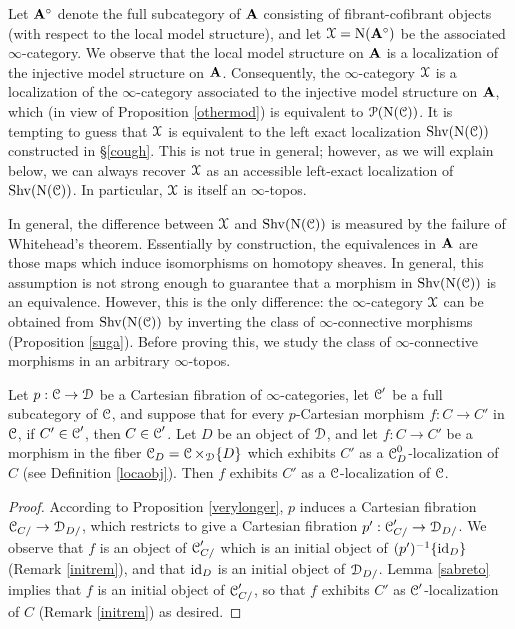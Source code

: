 Let ${\mathbf A}^{\circ}$ denote the full subcategory of ${\mathbf A}$ consisting of fibrant-cofibrant objects (with respect to the local model structure), and let $\operatorname{\mathcal{X}} = \operatorname{N}({\mathbf A}^{\circ})$ be the associated $\infty$-category. We observe that the local model structure on ${\mathbf A}$ is a localization of the injective model structure on ${\mathbf A}$. Consequently, the $\infty$-category $\operatorname{\mathcal{X}}$ is a localization of the $\infty$-category associated to the injective model structure on ${\mathbf A}$, which (in view of 
Proposition \ref{othermod}) is equivalent to $\operatorname{\mathcal{P}}( \operatorname{N}(\operatorname{\mathcal{C}}))$. It is tempting to guess
that $\operatorname{\mathcal{X}}$ is equivalent to the left exact localization $\operatorname{Shv}( \operatorname{N}(\operatorname{\mathcal{C}}))$ constructed in \S \ref{cough}. This is not true in general; however, as we will explain below, we can always recover $\operatorname{\mathcal{X}}$ as an accessible left-exact localization of $\operatorname{Shv}( \operatorname{N}(\operatorname{\mathcal{C}}))$. In particular, $\operatorname{\mathcal{X}}$
is itself an $\infty$-topos.

In general, the difference between $\operatorname{\mathcal{X}}$ and $\operatorname{Shv}( \operatorname{N}(\operatorname{\mathcal{C}}))$ is measured by the failure of Whitehead's theorem. Essentially by construction, the equivalences in ${\mathbf A}$ are those maps which induce isomorphisms on homotopy sheaves. In general, this assumption is not strong enough to guarantee that a morphism in $\operatorname{Shv}( \operatorname{N}(\operatorname{\mathcal{C}}) )$ is an equivalence. However, this is the only difference: the $\infty$-category $\operatorname{\mathcal{X}}$ can be obtained from
$\operatorname{Shv}(\operatorname{N}(\operatorname{\mathcal{C}}))$ by inverting the class of $\infty$-connective morphisms (Proposition \ref{suga}). Before proving this, we study the class of $\infty$-connective morphisms in an arbitrary
$\infty$-topos.

\begin{lemma}\label{swarp}
Let $p: \operatorname{\mathcal{C}} \rightarrow \operatorname{\mathcal{D}}$ be a Cartesian fibration of $\infty$-categories, let
$\operatorname{\mathcal{C}}'$ be a full subcategory of $\operatorname{\mathcal{C}}$, and suppose that for every $p$-Cartesian morphism
$f: C \rightarrow C'$ in $\operatorname{\mathcal{C}}$, if $C' \in \operatorname{\mathcal{C}}'$, then $C \in \operatorname{\mathcal{C}}'$. Let
$D$ be an object of $\operatorname{\mathcal{D}}$, and let $f: C \rightarrow C'$ be a morphism in the fiber
$\operatorname{\mathcal{C}}_{D} = \operatorname{\mathcal{C}} \times_{\operatorname{\mathcal{D}}} \{D\}$ which exhibits $C'$ as a $\operatorname{\mathcal{C}}^{0}_{D}$-localization
of $C$ (see Definition \ref{locaobj}). Then $f$ exhibits $C'$ as a $\operatorname{\mathcal{C}}$-localization of $\operatorname{\mathcal{C}}$.
\end{lemma}

\begin{proof}
According to Proposition \ref{verylonger}, $p$ induces a Cartesian fibration
$\operatorname{\mathcal{C}}_{C/} \rightarrow \operatorname{\mathcal{D}}_{D/}$, which restricts to give a Cartesian fibration
$p': \operatorname{\mathcal{C}}'_{C/} \rightarrow \operatorname{\mathcal{D}}_{D/}$. We observe that $f$ is an object of
$\operatorname{\mathcal{C}}'_{C/}$ which is an initial object of $(p')^{-1} \{ \operatorname{id}_{D} \}$ (Remark \ref{initrem}), 
and that $\operatorname{id}_{D}$ is an initial object of $\operatorname{\mathcal{D}}_{D/}$. Lemma \ref{sabreto} implies that $f$ is an initial object of $\operatorname{\mathcal{C}}'_{C/}$, so that $f$ exhibits $C'$ as $\operatorname{\mathcal{C}}'$-localization of $C$ (Remark \ref{initrem}) as desired.
\end{proof}

